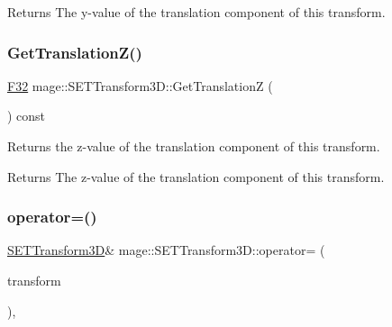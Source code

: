 \begin{DoxyReturn}{Returns}
The y-\/value of the translation component of this transform. 
\end{DoxyReturn}
\mbox{\label{classmage_1_1_s_e_t_transform3_d_a60627383e0448f2baf5cac5d01f8fed9}} 
\subsubsection{\texorpdfstring{Get\+Translation\+Z()}{GetTranslationZ()}}
{\footnotesize\ttfamily \mbox{\hyperlink{namespacemage_aa97e833b45f06d60a0a9c4fc22ae02c0}{F32}} mage\+::\+S\+E\+T\+Transform3\+D\+::\+Get\+TranslationZ (\begin{DoxyParamCaption}{ }\end{DoxyParamCaption}) const\hspace{0.3cm}{\ttfamily [noexcept]}}

Returns the z-\/value of the translation component of this transform.

\begin{DoxyReturn}{Returns}
The z-\/value of the translation component of this transform. 
\end{DoxyReturn}
\mbox{\label{classmage_1_1_s_e_t_transform3_d_a7eaf0bcb28dc4ab5cd83d844d726ab20}} 
\subsubsection{\texorpdfstring{operator=()}{operator=()}\hspace{0.1cm}{\footnotesize\ttfamily [1/2]}}
{\footnotesize\ttfamily \mbox{\hyperlink{classmage_1_1_s_e_t_transform3_d}{S\+E\+T\+Transform3D}}\& mage\+::\+S\+E\+T\+Transform3\+D\+::operator= (\begin{DoxyParamCaption}\item[{const \mbox{\hyperlink{classmage_1_1_s_e_t_transform3_d}{S\+E\+T\+Transform3D}} \&}]{transform }\end{DoxyParamCaption})\hspace{0.3cm}{\ttfamily [default]}, {\ttfamily [noexcept]}}

